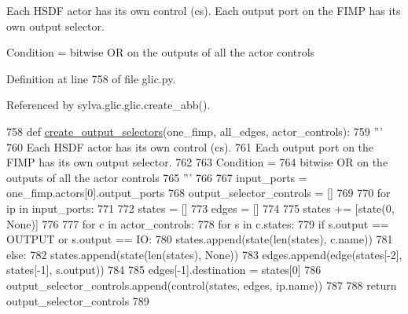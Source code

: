 \begin{DoxyVerb}  Each HSDF actor has its own control (cs).
  Each output port on the FIMP has its own output selector.

  Condition =
    bitwise OR on the outputs of all the actor controls
\end{DoxyVerb}
 

Definition at line 758 of file glic.\+py.



Referenced by sylva.\+glic.\+glic.\+create\+\_\+abb().


\begin{DoxyCode}
758     \textcolor{keyword}{def }\hyperlink{namespacesylva_1_1glic_1_1glic_a7eb9347832747ffffb52851a1ee2d08f}{create\_output\_selectors}(one\_fimp, all\_edges, actor\_controls):
759         \textcolor{stringliteral}{'''}
760 \textcolor{stringliteral}{          Each HSDF actor has its own control (cs).}
761 \textcolor{stringliteral}{          Each output port on the FIMP has its own output selector.}
762 \textcolor{stringliteral}{}
763 \textcolor{stringliteral}{          Condition =}
764 \textcolor{stringliteral}{            bitwise OR on the outputs of all the actor controls}
765 \textcolor{stringliteral}{        '''}
766 
767         input\_ports = one\_fimp.actors[0].output\_ports
768         output\_selector\_controls = []
769 
770         \textcolor{keywordflow}{for} ip \textcolor{keywordflow}{in} input\_ports:
771 
772             states = []
773             edges = []
774 
775             states += [state(0, \textcolor{keywordtype}{None})]
776 
777             \textcolor{keywordflow}{for} c \textcolor{keywordflow}{in} actor\_controls:
778                 \textcolor{keywordflow}{for} s \textcolor{keywordflow}{in} c.states:
779                     \textcolor{keywordflow}{if} s.output == OUTPUT \textcolor{keywordflow}{or} s.output == IO:
780                         states.append(state(len(states), c.name))
781                     \textcolor{keywordflow}{else}:
782                         states.append(state(len(states), \textcolor{keywordtype}{None}))
783                     edges.append(edge(states[-2], states[-1], s.output))
784 
785             edges[-1].destination = states[0]
786             output\_selector\_controls.append(control(states, edges, ip.name))
787 
788         \textcolor{keywordflow}{return} output\_selector\_controls
789 
\end{DoxyCode}
\mbox{\label{namespacesylva_1_1glic_1_1glic_a113a86d012f0236519ec7ac19e0e4850}} 
